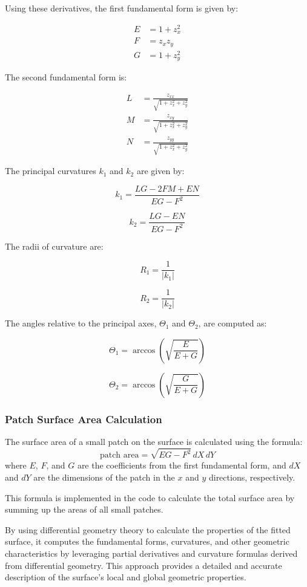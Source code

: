 \documentclass[12pt]{article}
\begin{document}
Using these derivatives, the first fundamental form is given by:

\[
\begin{aligned}
E &= 1 + z_x^2 \\
F &= z_x z_y \\
G &= 1 + z_y^2
\end{aligned}
\]

The second fundamental form is:

\[
\begin{aligned}
L &= \frac{z_{xx}}{\sqrt{1 + z_x^2 + z_y^2}} \\
M &= \frac{z_{xy}}{\sqrt{1 + z_x^2 + z_y^2}} \\
N &= \frac{z_{yy}}{\sqrt{1 + z_x^2 + z_y^2}}
\end{aligned}
\]

The principal curvatures \(k_1\) and \(k_2\) are given by:

\[
k_1 = \frac{L G - 2 F M + E N}{E G - F^2}
\]

\[
k_2 = \frac{L G - E N}{E G - F^2}
\]

The radii of curvature are:

\[
R_1 = \frac{1}{|k_1|}
\]

\[
R_2 = \frac{1}{|k_2|}
\]

The angles relative to the principal axes, \(\Theta_1\) and \(\Theta_2\), are computed as:

\[
\Theta_1 = \arccos \left( \sqrt{\frac{E}{E + G}} \right)
\]

\[
\Theta_2 = \arccos \left( \sqrt{\frac{G}{E + G}} \right)
\]

\subsubsection{Patch Surface Area Calculation}
The surface area of a small patch on the surface is calculated using the formula:
\[
\text{patch area} = \sqrt{E G - F^2} \, dX \, dY
\]
where \(E\), \(F\), and \(G\) are the coefficients from the first fundamental form, and \(dX\) and \(dY\) are the dimensions of the patch in the \(x\) and \(y\) directions, respectively.

This formula is implemented in the code to calculate the total surface area by summing up the areas of all small patches.

By using differential geometry theory to calculate the properties of the fitted surface, it computes the fundamental forms, curvatures, and other geometric characteristics by leveraging partial derivatives and curvature formulas derived from differential geometry. This approach provides a detailed and accurate description of the surface's local and global geometric properties.
\end{document}
